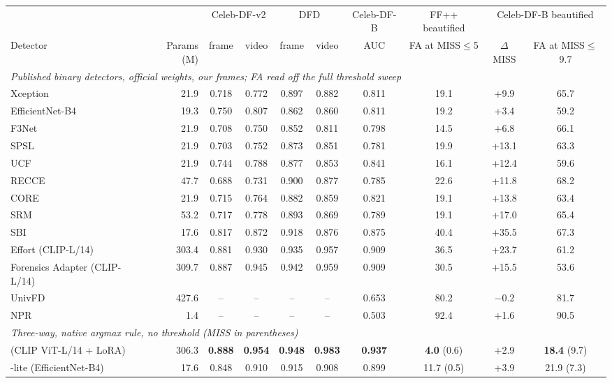 \begin{tabular}{lr cc cc c c cc}
\toprule
 & & \multicolumn{2}{c}{Celeb-DF-v2} & \multicolumn{2}{c}{DFD} & Celeb-DF-B & FF++ beautified & \multicolumn{2}{c}{Celeb-DF-B beautified} \\
\cmidrule(lr){3-4}\cmidrule(lr){5-6}\cmidrule(lr){7-7}\cmidrule(lr){8-8}\cmidrule(lr){9-10}
Detector & Params (M) & frame & video & frame & video & AUC & FA at MISS$\le$5 & $\Delta$MISS & FA at MISS$\le$9.7 \\
\midrule
\multicolumn{10}{l}{\textit{Published binary detectors, official weights, our frames; FA read off the full threshold sweep}} \\
Xception & 21.9 & 0.718 & 0.772 & 0.897 & 0.882 & 0.811 & 19.1 & +9.9 & 65.7 \\
EfficientNet-B4 & 19.3 & 0.750 & 0.807 & 0.862 & 0.860 & 0.811 & 19.2 & +3.4 & 59.2 \\
F3Net & 21.9 & 0.708 & 0.750 & 0.852 & 0.811 & 0.798 & 14.5 & +6.8 & 66.1 \\
SPSL & 21.9 & 0.703 & 0.752 & 0.873 & 0.851 & 0.781 & 19.9 & +13.1 & 63.3 \\
UCF & 21.9 & 0.744 & 0.788 & 0.877 & 0.853 & 0.841 & 16.1 & +12.4 & 59.6 \\
RECCE & 47.7 & 0.688 & 0.731 & 0.900 & 0.877 & 0.785 & 22.6 & +11.8 & 68.2 \\
CORE & 21.9 & 0.715 & 0.764 & 0.882 & 0.859 & 0.821 & 19.1 & +13.8 & 63.4 \\
SRM & 53.2 & 0.717 & 0.778 & 0.893 & 0.869 & 0.789 & 19.1 & +17.0 & 65.4 \\
SBI & 17.6 & 0.817 & 0.872 & 0.918 & 0.876 & 0.875 & 40.4 & +35.5 & 67.3 \\
Effort (CLIP-L/14) & 303.4 & 0.881 & 0.930 & 0.935 & 0.957 & 0.909 & 36.5 & +23.7 & 61.2 \\
Forensics Adapter (CLIP-L/14) & 309.7 & 0.887 & 0.945 & 0.942 & 0.959 & 0.909 & 30.5 & +15.5 & 53.6 \\
UnivFD & 427.6 & -- & -- & -- & -- & 0.653 & 80.2 & $-$0.2 & 81.7 \\
NPR & 1.4 & -- & -- & -- & -- & 0.503 & 92.4 & +1.6 & 90.5 \\
\midrule
\multicolumn{10}{l}{\textit{Three-way, native argmax rule, no threshold (MISS in parentheses)}} \\
\textbf{\ours{}} (CLIP ViT-L/14 + LoRA) & 306.3 & \textbf{0.888} & \textbf{0.954} & \textbf{0.948} & \textbf{0.983} & \textbf{0.937} & \textbf{4.0} (0.6) & +2.9 & \textbf{18.4} (9.7) \\
\ours{}-lite (EfficientNet-B4) & 17.6 & 0.848 & 0.910 & 0.915 & 0.908 & 0.899 & 11.7 (0.5) & +3.9 & 21.9 (7.3) \\
\bottomrule
\end{tabular}
